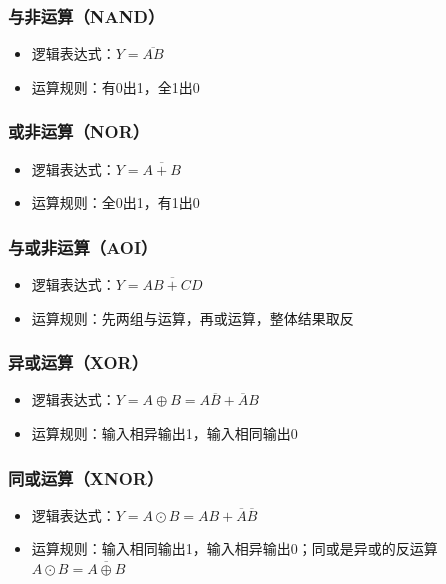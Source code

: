\subsubsection{与非运算（NAND）}
\begin{itemize}
    \item 逻辑表达式：$Y = \overline{AB}$
    \item 运算规则：有0出1，全1出0
\end{itemize}

\subsubsection{或非运算（NOR）}
\begin{itemize}
    \item 逻辑表达式：$Y = \overline{A+B}$
    \item 运算规则：全0出1，有1出0
\end{itemize}

\subsubsection{与或非运算（AOI）}
\begin{itemize}
    \item 逻辑表达式：$Y = \overline{AB+CD}$
    \item 运算规则：先两组与运算，再或运算，整体结果取反
\end{itemize}

\subsubsection{异或运算（XOR）}
\begin{itemize}
    \item 逻辑表达式：$Y = A \oplus B = A\overline{B}+\overline{A}B$
    \item 运算规则：输入相异输出1，输入相同输出0
\end{itemize}

\subsubsection{同或运算（XNOR）}
\begin{itemize}
    \item 逻辑表达式：$Y = A \odot B = AB+\overline{A}\overline{B}$
    \item 运算规则：输入相同输出1，输入相异输出0；同或是异或的反运算 $A\odot B=\overline{A\oplus B}$
\end{itemize}

